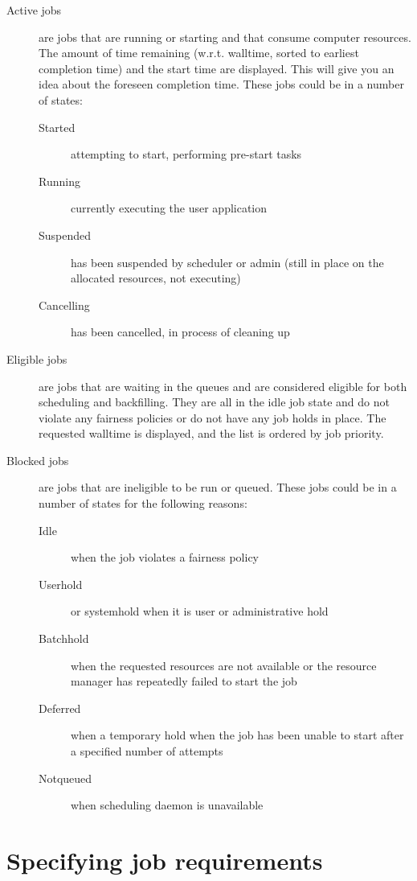 \begin{description}
  \item[Active jobs] are jobs that are running or starting and that consume computer resources. The amount of time remaining (w.r.t. walltime, sorted to earliest completion time) and the start time are displayed. This will give you an idea about the foreseen completion time. These jobs could be in a number of states:

  \begin{description}
    \item[Started] attempting to start, performing pre-start tasks
    \item[Running] currently executing the user application
    \item[Suspended] has been suspended by scheduler or admin (still in place
      on the allocated resources, not executing)
    \item[Cancelling] has been cancelled, in process of cleaning up
  \end{description}

  \item[Eligible jobs] are jobs that are waiting in the queues and are
    considered eligible for both scheduling and backfilling.  They are all in
    the idle job state and do not violate any fairness policies or do not have
    any job holds in place. The requested walltime is displayed, and the list
    is ordered by job priority.
  \item[Blocked jobs] are jobs that are ineligible to be run or queued.  These
    jobs could be in a number of states for the following reasons:

  \begin{description}
    \item[Idle] when the job violates a fairness policy
    \item[Userhold] or systemhold when it is user or administrative hold
    \item[Batchhold] when the requested resources are not available or the resource manager has repeatedly failed to start the job
    \item[Deferred] when a temporary hold when the job has been unable to start after a specified number of attempts
    \item[Notqueued] when scheduling daemon is unavailable
  \end{description}
\end{description}

\section{Specifying job requirements}

